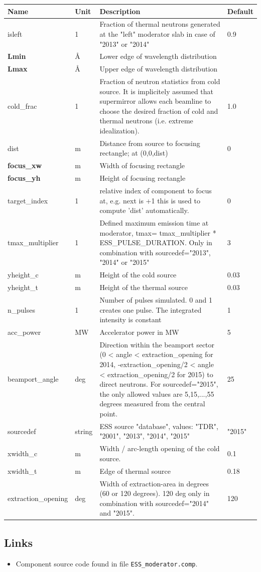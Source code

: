 \begin{longtable}{p{}p{}p{}p{}}
\toprule
\textbf{Name} & \textbf{Unit} & \textbf{Description} & \textbf{Default} \\
\midrule
\endhead
isleft & 1 & Fraction of thermal neutrons generated at the "left" moderator slab in case of "2013" or "2014" & 0.9 \\
\textbf{Lmin} & \AA{} & Lower edge of wavelength distribution &  \\
\textbf{Lmax} & \AA{} & Upper edge of wavelength distribution &  \\
cold\_frac & 1 & Fraction of neutron statistics from cold source. It is implicitely assumed that supermirror allows each beamline to choose the desired fraction of cold and thermal neutrons (i.e. extreme idealization). & 1.0 \\
dist & m & Distance from source to focusing rectangle; at (0,0,dist) & 0 \\
\textbf{focus\_xw} & m & Width of focusing rectangle &  \\
\textbf{focus\_yh} & m & Height of focusing rectangle &  \\
target\_index & 1 & relative index of component to focus at, e.g. next is +1 this is used to compute 'dist' automatically. & 0 \\
tmax\_multiplier & 1 & Defined maximum emission time at moderator, tmax= tmax\_multiplier * ESS\_PULSE\_DURATION. Only in combination with sourcedef="2013", "2014" or "2015" & 3 \\
yheight\_c & m & Height of the cold source & 0.03 \\
yheight\_t & m & Height of the thermal source & 0.03 \\
n\_pulses & 1 & Number of pulses simulated. 0 and 1 creates one pulse. The integrated intensity is constant & 1 \\
acc\_power & MW & Accelerator power in MW & 5 \\
beamport\_angle & deg & Direction within the beamport sector (0 \textless{} angle \textless{} extraction\_opening for 2014, -extraction\_opening/2 \textless{} angle \textless{} extraction\_opening/2 for 2015) to direct neutrons. For sourcedef="2015", the only allowed values are 5,15,...,55 degrees measured from the central point. & 25 \\
sourcedef & string & ESS source "database", values: "TDR", "2001", "2013", "2014", "2015" & "2015" \\
xwidth\_c & m & Width / arc-length opening of the cold source. & 0.1 \\
xwidth\_t & m & Edge of thermal source & 0.18 \\
extraction\_opening & deg & Width of extraction-area in degrees (60 or 120 degrees). 120 deg only in combination with sourcedef="2014" and "2015". & 120 \\
\bottomrule
\end{longtable}

\subsection*{Links}
\begin{itemize}
  \item Component source code found in file \texttt{ESS\_moderator.comp}.
\end{itemize}
